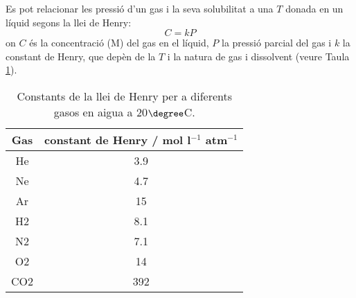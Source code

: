 
Es pot relacionar les pressió d'un gas i la seva solubilitat a una $T$ donada en un líquid segons la llei de Henry:
\[
C=kP
\]
on $C$ és la concentració (M) del gas en el líquid, $P$ la pressió parcial del gas i $k$ la constant de Henry, que depèn de la $T$ i la natura de gas i dissolvent (veure Taula \ref{tab:Henry}).

\begin{table}[h!]
  \begin{center}
    \caption{Constants de la llei de Henry per a diferents gasos en aigua a 20$\degree$C.}
    \label{tab:Henry}
    \begin{tabular}{cc}
      \hline
      Gas & constant de Henry / mol l$^{-1}$ atm$^{-1}$ \\
      \hline
He &	3.9\\
Ne &	4.7\\
Ar &	15\\
H2 &	8.1\\
N2 &	7.1\\
O2 &	14\\
CO2& 	392\\      
      \hline
    \end{tabular}
  \end{center}
\end{table}
